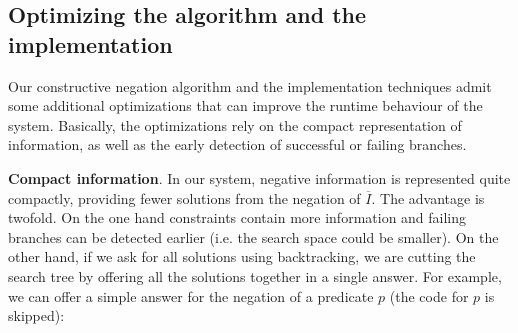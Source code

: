 \documentclass{llncs}
\begin{document}




\subsection{Optimizing the algorithm and the implementation}
\label{optimization}

Our constructive negation algorithm and the implementation techniques
admit some additional optimizations that can improve the runtime
behaviour of the system. Basically, the optimizations rely on the
compact representation of information, as well as the early detection
of successful or failing branches.

\noindent
{\bf Compact information}. In our system, negative information is
represented quite compactly, providing fewer solutions from the
negation of $\overline{I}$. The advantage is twofold. On the one hand
constraints contain more information and failing branches can be
detected earlier (i.e. the search space could be smaller). On the
other hand, if we ask for all solutions using backtracking, we are
cutting the search tree by offering all the solutions together in a
single answer. For example, we can offer a simple answer for the
negation of a predicate $p$ (the code for $p$ is skipped):
\end{document}
